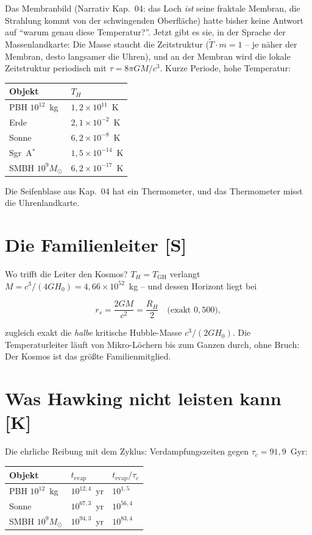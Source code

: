 Das Membranbild (Narrativ Kap.~04: das Loch \emph{ist} seine
fraktale Membran, die Strahlung kommt von der schwingenden
Oberfläche) hatte bisher keine Antwort auf \enquote{warum genau
diese Temperatur?}. Jetzt gibt es sie, in der Sprache der
Massenlandkarte: Die Masse staucht die Zeitstruktur
($\tilde T \cdot m = 1$ -- je näher der Membran, desto langsamer
die Uhren), und an der Membran wird die lokale Zeitstruktur
periodisch mit $\tau = 8\pi GM/c^3$. Kurze Periode, hohe
Temperatur:

\begin{center}
\begin{tabular}{ll}
\toprule
Objekt & $T_H$ \\
\midrule
PBH $10^{12}$~kg & $1{,}2\times10^{11}$~K \\
Erde & $2{,}1\times10^{-2}$~K \\
Sonne & $6{,}2\times10^{-8}$~K \\
Sgr~A$^{*}$ & $1{,}5\times10^{-14}$~K \\
SMBH $10^{9}M_\odot$ & $6{,}2\times10^{-17}$~K \\
\bottomrule
\end{tabular}
\end{center}

Die Seifenblase aus Kap.~04 hat ein Thermometer, und das
Thermometer misst die Uhrenlandkarte.

\section{Die Familienleiter [S]}

Wo trifft die Leiter den Kosmos? $T_H = T_\text{GH}$ verlangt
$M = c^3/(4GH_0) = 4{,}66\times10^{52}$~kg -- und dessen
Horizont liegt bei

\[
  r_s = \frac{2GM}{c^2} = \frac{R_H}{2} \quad\text{(exakt } 0{,}500\text{)},
\]

zugleich exakt die \emph{halbe} kritische Hubble-Masse
$c^3/(2GH_0)$. Die Temperaturleiter läuft von Mikro-Löchern bis
zum Ganzen durch, ohne Bruch: Der Kosmos ist das größte
Familienmitglied.

\section{Was Hawking nicht leisten kann [K]}

Die ehrliche Reibung mit dem Zyklus: Verdampfungszeiten gegen
$\tau_c = 91{,}9$~Gyr:

\begin{center}
\begin{tabular}{lll}
\toprule
Objekt & $t_\text{evap}$ & $t_\text{evap}/\tau_c$ \\
\midrule
PBH $10^{12}$~kg & $10^{12{,}4}$~yr & $10^{1{,}5}$ \\
Sonne & $10^{67{,}3}$~yr & $10^{56{,}4}$ \\
SMBH $10^{9}M_\odot$ & $10^{94{,}3}$~yr & $10^{83{,}4}$ \\
\bottomrule
\end{tabular}
\end{center}

